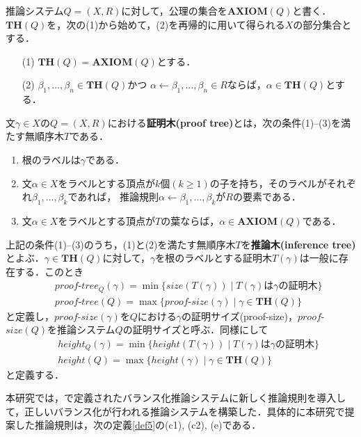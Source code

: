 推論システム$Q=(X,R)$に対して，公理の集合を$\textbf{AXIOM}(Q)$と書く．
$\textbf{TH}(Q)$を，次の(1)から始めて，(2)を再帰的に用いて得られる$X$の部分集合とする．
\begin{enumerate}
\item[(1)] $\textbf{TH}(Q)=\textbf{AXIOM}(Q)$とする．
\item[(2)] $\beta_{1},\ldots,\beta_{n}\in \textbf{TH}(Q)$かつ
$\alpha \leftarrow \beta_{1}, \ldots, \beta_{n}\in R$ならば，$\alpha\in\textbf{TH}(Q)$とする．
\end{enumerate}

文$\gamma\in X$の$Q=(X,R)$における\textbf{証明木(proof tree)}とは，次の条件(1)--(3)を満たす無順序木$T$である．
\begin{enumerate}
\item 根のラベルは$\gamma$である．
\item 文$\alpha\in X$をラベルとする頂点が$k$個$(k\geq 1)$の子を持ち，そのラベルがそれぞれ$\beta_{1},\ldots,\beta_{k}$であれば， 推論規則$\alpha \leftarrow \beta_{1}, \ldots, \beta_{k}$が$R$の要素である．
\item 文$\alpha\in X$をラベルとする頂点が$T$の葉ならば，$\alpha\in \textbf{AXIOM}(Q)$である．
\end{enumerate}

上記の条件(1)--(3)のうち，(1)と(2)を満たす無順序木$T$を\textbf{推論木(inference tree)}とよぶ．$\gamma\in \textbf{TH}(Q)$に対して，$\gamma$を根のラベルとする証明木$T(\gamma)$は一般に存在する．このとき
  \begin{eqnarray*}
    && proof\mbox{-}tree_Q(\gamma)=\min\{size(T(\gamma))\mid T(\gamma)は\gamma の証明木\}\\
    && proof\mbox{-}tree(Q)=\max\{proof\mbox{-}size(\gamma)\mid \gamma\in \textbf{TH}(Q)\}
  \end{eqnarray*}
  と定義し，$proof$-$size(\gamma)$を$Q$における$\gamma$の証明サイズ(proof-size)，$proof$-$size(Q)$を推論システム$Q$の証明サイズと呼ぶ．同様にして
  \begin{eqnarray*}
    && height_Q(\gamma)=\min\{height(T(\gamma))\mid T(\gamma)は\gamma の証明木\}\\
    && height(Q)=\max\{height(\gamma)\mid \gamma\in \textbf{TH}(Q)\}
  \end{eqnarray*}
  と定義する．

本研究では，\cite{miyano-parallel1993}で定義されたバランス化推論システムに新しく推論規則を導入して，正しいバランス化が行われる推論システムを構築した．具体的に本研究で提案した推論規則は，次の定義\ref{def5}の(c1), (c2), (e)である．

